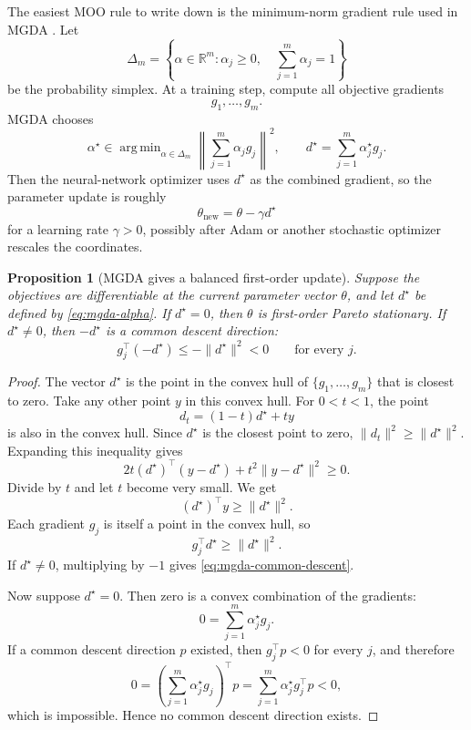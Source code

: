 \documentclass[11pt]{article}
\newtheorem{proposition}{Proposition}
\newcommand{\R}{\mathbb{R}}
\newcommand{\1}{\mathbf{1}}
\DeclareMathOperator*{\argmin}{arg\,min}
\begin{document}
The easiest MOO rule to write down is the minimum-norm gradient rule used in
MGDA \citep{desideri2012mgda}. Let
\[
  \Delta_m
  =
  \left\{
    \alpha\in\R^m:
    \alpha_j\ge0,\quad
    \sum_{j=1}^m\alpha_j=1
  \right\}
\]
be the probability simplex. At a training step, compute all objective gradients
\[
  g_1,\ldots,g_m.
\]
MGDA chooses
\begin{equation}
  \alpha^\star
  \in
  \argmin_{\alpha\in\Delta_m}
  \left\|
    \sum_{j=1}^m \alpha_j g_j
  \right\|^2,
  \qquad
  d^\star=\sum_{j=1}^m\alpha_j^\star g_j.
  \label{eq:mgda-alpha}
\end{equation}
Then the neural-network optimizer uses \(d^\star\) as the combined gradient, so
the parameter update is roughly
\[
  \theta_{\mathrm{new}}
  =
  \theta-\gamma d^\star
\]
for a learning rate \(\gamma>0\), possibly after Adam or another stochastic
optimizer rescales the coordinates.

\begin{proposition}[MGDA gives a balanced first-order update]
\label{prop:mgda-common-descent}
Suppose the objectives are differentiable at the current parameter vector
\(\theta\), and let \(d^\star\) be defined by \cref{eq:mgda-alpha}.
If \(d^\star=0\), then \(\theta\) is first-order Pareto stationary. If
\(d^\star\ne0\), then \(-d^\star\) is a common descent direction:
\begin{equation}
  g_j^\top(-d^\star)\le -\|d^\star\|^2<0
  \qquad\text{for every }j.
  \label{eq:mgda-common-descent}
\end{equation}
\end{proposition}

\begin{proof}
The vector \(d^\star\) is the point in the convex hull of
\(\{g_1,\ldots,g_m\}\) that is closest to zero. Take any other point \(y\) in
this convex hull. For \(0<t<1\), the point
\[
  d_t=(1-t)d^\star+ty
\]
is also in the convex hull. Since \(d^\star\) is the closest point to zero,
\(\|d_t\|^2\ge \|d^\star\|^2\). Expanding this inequality gives
\[
  2t(d^\star)^\top(y-d^\star)+t^2\|y-d^\star\|^2\ge0.
\]
Divide by \(t\) and let \(t\) become very small. We get
\[
  (d^\star)^\top y\ge \|d^\star\|^2.
\]
Each gradient \(g_j\) is itself a point in the convex hull, so
\[
  g_j^\top d^\star\ge \|d^\star\|^2.
\]
If \(d^\star\ne0\), multiplying by \(-1\) gives
\cref{eq:mgda-common-descent}.

Now suppose \(d^\star=0\). Then zero is a convex combination of the gradients:
\[
  0=\sum_{j=1}^m\alpha_j^\star g_j.
\]
If a common descent direction \(p\) existed, then \(g_j^\top p<0\) for every
\(j\), and therefore
\[
  0
  =
  \left(\sum_{j=1}^m\alpha_j^\star g_j\right)^\top p
  =
  \sum_{j=1}^m\alpha_j^\star g_j^\top p
  <0,
\]
which is impossible. Hence no common descent direction exists.
\end{proof}
\end{document}
